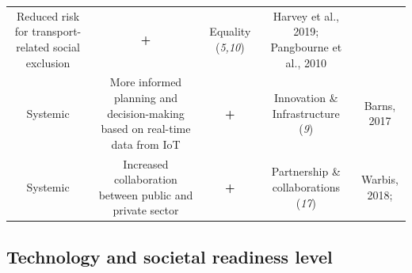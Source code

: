 \documentclass[
]{book}
\begin{document}
\begin{longtable}[]{@{}ccccc@{}}
\begin{minipage}[t]{0.16\columnwidth}
Reduced risk for transport-related social exclusion\strut
\end{minipage} & \begin{minipage}[t]{0.17\columnwidth}\centering
\textbf{+}\strut
\end{minipage} & \begin{minipage}[t]{0.17\columnwidth}\centering
Equality (\emph{5,10})\strut
\end{minipage} & \begin{minipage}[t]{0.17\columnwidth}\centering
Harvey et al., 2019; Pangbourne et al., 2010\strut
\end{minipage}\tabularnewline
\begin{minipage}[t]{0.17\columnwidth}\centering
Systemic\strut
\end{minipage} & \begin{minipage}[t]{0.16\columnwidth}\centering
More informed planning and decision-making based on real-time data from IoT\strut
\end{minipage} & \begin{minipage}[t]{0.17\columnwidth}\centering
\textbf{+}\strut
\end{minipage} & \begin{minipage}[t]{0.17\columnwidth}\centering
Innovation \& Infrastructure (\emph{9})\strut
\end{minipage} & \begin{minipage}[t]{0.17\columnwidth}\centering
Barns, 2017\strut
\end{minipage}\tabularnewline
\begin{minipage}[t]{0.17\columnwidth}\centering
Systemic\strut
\end{minipage} & \begin{minipage}[t]{0.16\columnwidth}\centering
Increased collaboration between public and private sector\strut
\end{minipage} & \begin{minipage}[t]{0.17\columnwidth}\centering
\textbf{+}\strut
\end{minipage} & \begin{minipage}[t]{0.17\columnwidth}\centering
Partnership \& collaborations (\emph{17})\strut
\end{minipage} & \begin{minipage}[t]{0.17\columnwidth}\centering
Warbis, 2018;\strut
\end{minipage}\tabularnewline
\bottomrule
\end{longtable}

\hypertarget{technology-and-societal-readiness-level-3}{%
\subsection*{Technology and societal readiness level}\label{technology-and-societal-readiness-level-3}}
\end{document}
